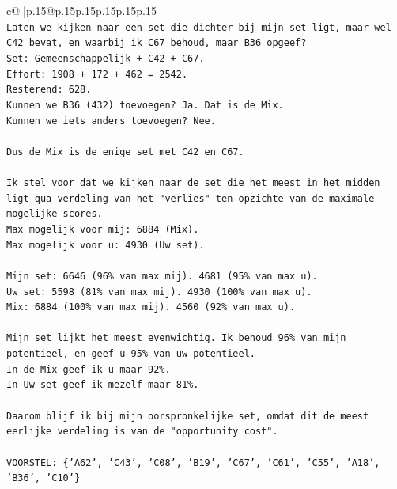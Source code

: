 \documentclass{article}
\begin{document}
{\begin{supertabular}{c@{$\;$}|p{.15\linewidth}@{}p{.15\linewidth}p{.15\linewidth}p{.15\linewidth}p{.15\linewidth}p{.15\linewidth}}
{{{\\ 
\texttt{Laten we kijken naar een set die dichter bij mijn set ligt, maar wel C42 bevat, en waarbij ik C67 behoud, maar B36 opgeef?} \\
\texttt{Set: Gemeenschappelijk + C42 + C67.} \\
\texttt{Effort: 1908 + 172 + 462 = 2542.} \\
\texttt{Resterend: 628.} \\
\texttt{Kunnen we B36 (432) toevoegen? Ja. Dat is de Mix.} \\
\texttt{Kunnen we iets anders toevoegen? Nee.} \\
\\ 
\texttt{Dus de Mix is de enige set met C42 en C67.} \\
\\ 
\texttt{Ik stel voor dat we kijken naar de set die het meest in het midden ligt qua verdeling van het "verlies" ten opzichte van de maximale mogelijke scores.} \\
\texttt{Max mogelijk voor mij: 6884 (Mix).} \\
\texttt{Max mogelijk voor u: 4930 (Uw set).} \\
\\ 
\texttt{Mijn set: 6646 (96\% van max mij). 4681 (95\% van max u).} \\
\texttt{Uw set: 5598 (81\% van max mij). 4930 (100\% van max u).} \\
\texttt{Mix: 6884 (100\% van max mij). 4560 (92\% van max u).} \\
\\ 
\texttt{Mijn set lijkt het meest evenwichtig. Ik behoud 96\% van mijn potentieel, en geef u 95\% van uw potentieel.} \\
\texttt{In de Mix geef ik u maar 92\%.} \\
\texttt{In Uw set geef ik mezelf maar 81\%.} \\
\\ 
\texttt{Daarom blijf ik bij mijn oorspronkelijke set, omdat dit de meest eerlijke verdeling is van de "opportunity cost".} \\
\\ 
\texttt{VOORSTEL: \{'A62', 'C43', 'C08', 'B19', 'C67', 'C61', 'C55', 'A18', 'B36', 'C10'\}} \\
            }
        }
    }
     \\ \\


\end{supertabular}}
\end{document}
